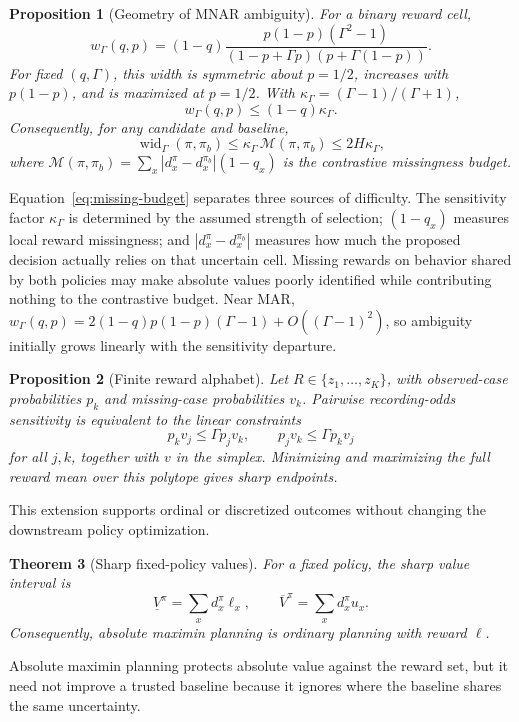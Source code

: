 \documentclass[letterpaper]{article}
\newtheorem{theorem}{Theorem}
\newtheorem{proposition}[theorem]{Proposition}
\theoremstyle{remark}
\begin{document}
\begin{proposition}[Geometry of MNAR ambiguity]\label{prop:geometry}
For a binary reward cell,
\begin{equation}
 w_\Gamma(q,p)=
 (1-q)\frac{p(1-p)(\Gamma^2-1)}
 {(1-p+\Gamma p)(p+\Gamma(1-p))}. \label{eq:closed-width}
\end{equation}
For fixed $(q,\Gamma)$, this width is symmetric about $p=1/2$, increases with $p(1-p)$, and is maximized at $p=1/2$. With
$\kappa_\Gamma=(\Gamma-1)/(\Gamma+1)$,
\begin{equation}
 w_\Gamma(q,p)\leq (1-q)\kappa_\Gamma. \label{eq:cell-envelope}
\end{equation}
Consequently, for any candidate and baseline,
\begin{equation}
\operatorname{wid}_\Gamma(\pi,\pi_b)
\leq \kappa_\Gamma\,\mathcal M(\pi,\pi_b)
\leq 2H\kappa_\Gamma, \label{eq:missing-budget}
\end{equation}
where
$\mathcal M(\pi,\pi_b)=\sum_x|d_x^\pi-d_x^{\pi_b}|(1-q_x)$
is the \emph{contrastive missingness budget}.
\end{proposition}

Equation~\eqref{eq:missing-budget} separates three sources of difficulty. The sensitivity factor $\kappa_\Gamma$ is determined by the assumed strength of selection; $(1-q_x)$ measures local reward missingness; and $|d_x^\pi-d_x^{\pi_b}|$ measures how much the proposed decision actually relies on that uncertain cell. Missing rewards on behavior shared by both policies may make absolute values poorly identified while contributing nothing to the contrastive budget. Near MAR, $w_\Gamma(q,p)=2(1-q)p(1-p)(\Gamma-1)+O((\Gamma-1)^2)$, so ambiguity initially grows linearly with the sensitivity departure.

\begin{proposition}[Finite reward alphabet]\label{prop:finite-support}
Let $R\in\{z_1,\ldots,z_K\}$, with observed-case probabilities $p_k$ and missing-case probabilities $v_k$. Pairwise recording-odds sensitivity is equivalent to the linear constraints
\[
p_kv_j\leq\Gamma p_jv_k,\qquad p_jv_k\leq\Gamma p_kv_j
\]
for all $j,k$, together with $v$ in the simplex. Minimizing and maximizing the full reward mean over this polytope gives sharp endpoints.
\end{proposition}
This extension supports ordinal or discretized outcomes without changing the downstream policy optimization.

\begin{theorem}[Sharp fixed-policy values]\label{thm:value}
For a fixed policy, the sharp value interval is
\begin{equation}
\underline V^\pi=\sum_xd_x^\pi\ell_x,\qquad
\overline V^\pi=\sum_xd_x^\pi u_x. \label{eq:value}
\end{equation}
Consequently, absolute maximin planning is ordinary planning with reward $\ell$.
\end{theorem}
Absolute maximin planning protects absolute value against the reward set, but it need not improve a trusted baseline because it ignores where the baseline shares the same uncertainty.
\end{document}
